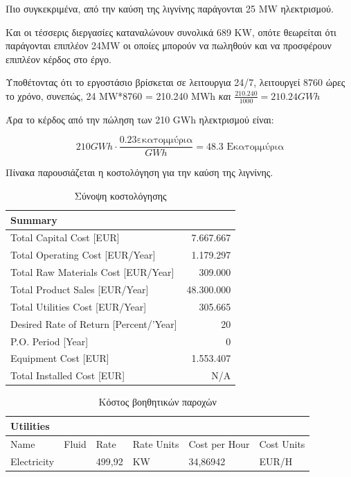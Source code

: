 \documentclass[11pt]{article}
\begin{document}
Πιο συγκεκριμένα, από την καύση της λιγνίνης παράγονται 25 MW
ηλεκτρισμού.

Και οι τέσσερις διεργασίες καταναλώνουν συνολικά 689 KW, οπότε θεωρείται
ότι παράγονται επιπλέον 24MW οι οποίες μπορούν να πωληθούν και να
προσφέρουν επιπλέον κέρδος στο έργο.

Υποθέτοντας ότι το εργοστάσιο βρίσκεται σε λειτουργια 24/7, λειτουργεί
8760 ώρες το χρόνο, συνεπώς, 24 MW*8760 = 210.240 MWh
\emph{και} \(\frac{210.240}{1000} =  210.24 GWh\)

Άρα το κέρδος από την πώληση των 210 GWh ηλεκτρισμού είναι:

\[ 210 GWh \cdot \frac{0.23 \text{εκατομμύρια}}{GWh} = 48.3 \text{ Εκατομμύρια} \]

Πίνακα παρουσιάζεται η κοστολόγηση για την καύση της λιγνίνης.

\begin{table}[htbp]
\caption{Σύνοψη κοστολόγησης}
\centering
\begin{tabular}{lr}
Summary & \\
\hline
Total Capital Cost [EUR] & 7.667.667\\
Total Operating Cost [EUR/Year] & 1.179.297\\
Total Raw Materials Cost [EUR/Year] & 309.000\\
Total Product Sales [EUR/Year] & 48.300.000\\
Total Utilities Cost [EUR/Year] & 305.665\\
Desired Rate of Return [Percent/'Year] & 20\\
P.O. Period [Year] & 0\\
Equipment Cost [EUR] & 1.553.407\\
Total Installed Cost [EUR] & N/A\\
\end{tabular}
\end{table}

\begin{table}[htbp]
\caption{Κόστος βοηθητικών παροχών}
\centering
\begin{tabular}{llllll}
Utilities &  &  &  &  & \\
\hline
Name & Fluid & Rate & Rate Units & Cost per Hour & Cost Units\\
Electricity &   & 499,92 & KW & 34,86942 & EUR/H\\
\end{tabular}
\end{table}
\end{document}
